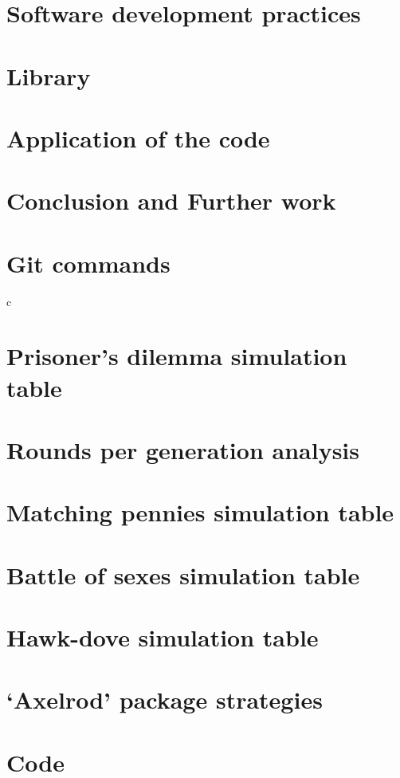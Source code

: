 \documentclass[12pt]{report}
\begin{document}
\chapter{Software development practices}


\chapter{Library}


\chapter{Application of the code}


\chapter{Conclusion and Further work}


\appendix
\chapter{Git commands}

c
\chapter{Prisoner's dilemma simulation table}


\chapter{Rounds per generation analysis}


\chapter{Matching pennies simulation table}


\chapter{Battle of sexes simulation table}


\chapter{Hawk-dove simulation table}


\chapter{`Axelrod' package strategies}


\chapter{Code}


\newpage


\end{document}
